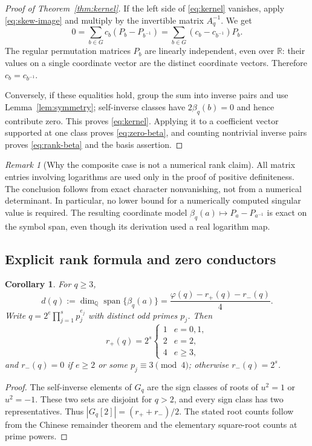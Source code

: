 \documentclass[11pt]{article}
\numberwithin{equation}{section}
\newtheorem{corollary}[theorem]{Corollary}
\theoremstyle{definition}
\theoremstyle{remark}
\newtheorem{remark}[theorem]{Remark}
\newcommand{\Q}{\mathbb Q}
\newcommand{\R}{\mathbb R}
\DeclareMathOperator{\Span}{span}
\begin{document}
\begin{proof}[Proof of Theorem~\ref{thm:kernel}]
If the left side of \eqref{eq:kernel} vanishes, apply
\eqref{eq:skew-image} and multiply by the invertible matrix $A_q^{-1}$.
We get
\[
 0=\sum_{b\in G}c_b(P_b-P_{b^{-1}})
 =\sum_{b\in G}(c_b-c_{b^{-1}})P_b.
\]
The regular permutation matrices $P_b$ are linearly independent, even
over $\R$: their values on a single coordinate vector are the distinct
coordinate vectors. Therefore $c_b=c_{b^{-1}}$.

Conversely, if these equalities hold, group the sum into inverse pairs
and use Lemma~\ref{lem:symmetry}; self-inverse classes have
$2\beta_q(b)=0$ and hence contribute zero. This proves
\eqref{eq:kernel}. Applying it to a coefficient vector supported at one
class proves \eqref{eq:zero-beta}, and counting nontrivial inverse pairs
proves \eqref{eq:rank-beta} and the basis assertion.
\end{proof}

\begin{remark}[Why the composite case is not a numerical rank claim]
All matrix entries involving logarithms are used only in the proof of
positive definiteness. The conclusion follows from exact character
nonvanishing, not from a numerical determinant. In particular, no lower
bound for a numerically computed singular value is required. The resulting
coordinate model $\beta_q(a)\mapsto P_a-P_{a^{-1}}$ is exact on the
symbol span, even though its derivation used a real logarithm map.
\end{remark}

\subsection{Explicit rank formula and zero conductors}

\begin{corollary}\label{cor:rank-CRT}
For $q\ge3$,
\[
 d(q):=\dim_\Q\Span\{\beta_q(a)\}
 =\frac{\varphi(q)-r_+(q)-r_-(q)}4.
\]
Write $q=2^e\prod_{j=1}^s p_j^{e_j}$ with distinct odd primes $p_j$.
Then
\[
 r_+(q)=2^s\begin{cases}1&e=0,1,\\2&e=2,\\4&e\ge3,\end{cases}
\]
and $r_-(q)=0$ if $e\ge2$ or some $p_j\equiv3\pmod4$; otherwise
$r_-(q)=2^s$.
\end{corollary}
\begin{proof}
The self-inverse elements of $G_q$ are the sign classes of roots of
$u^2=1$ or $u^2=-1$. These two sets are disjoint for $q>2$, and every
sign class has two representatives. Thus
$|G_q[2]|=(r_++r_-)/2$. The stated root counts follow from the Chinese
remainder theorem and the elementary square-root counts at prime powers.
\end{proof}
\end{document}
